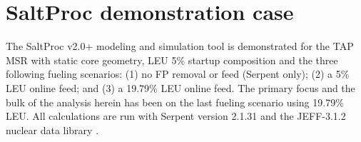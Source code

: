 \documentclass[12pt]{article} %
\begin{document}
\section{SaltProc demonstration case}
The SaltProc v2.0+ modeling and simulation tool is demonstrated for the 
\gls{TAP} \gls{MSR} with static core geometry, \gls{LEU} 5\% startup 
composition  \cite{transatomic_power_corporation_neutronics_2016} and the 
three following fueling scenarios: (1) no \gls{FP} removal or feed (Serpent 
only); (2) a 5\% \gls{LEU} online feed; and (3) a 19.79\% \gls{LEU} online 
feed. The primary focus and the bulk of the analysis herein has been on the 
last fueling scenario using 19.79\% \gls{LEU}. All calculations are run with 
Serpent version 2.1.31 and the JEFF-3.1.2 nuclear data library 
\cite{leppanen_serpent_2013, oecd/nea_jeff-3.1.2_2014}.
\end{document}
